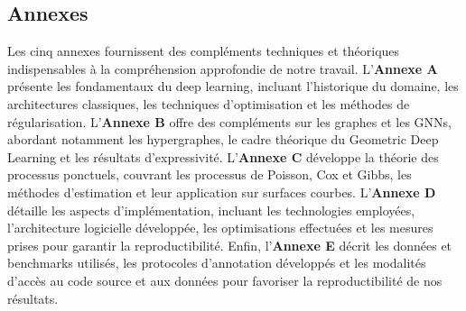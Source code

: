 \subsection{Annexes}

Les cinq annexes fournissent des compléments techniques et théoriques indispensables à la compréhension approfondie de notre travail. L'\textbf{Annexe A} présente les fondamentaux du deep learning, incluant l'historique du domaine, les architectures classiques, les techniques d'optimisation et les méthodes de régularisation. L'\textbf{Annexe B} offre des compléments sur les graphes et les GNNs, abordant notamment les hypergraphes, le cadre théorique du Geometric Deep Learning et les résultats d'expressivité. L'\textbf{Annexe C} développe la théorie des processus ponctuels, couvrant les processus de Poisson, Cox et Gibbs, les méthodes d'estimation et leur application sur surfaces courbes. L'\textbf{Annexe D} détaille les aspects d'implémentation, incluant les technologies employées, l'architecture logicielle développée, les optimisations effectuées et les mesures prises pour garantir la reproductibilité. Enfin, l'\textbf{Annexe E} décrit les données et benchmarks utilisés, les protocoles d'annotation développés et les modalités d'accès au code source et aux données pour favoriser la reproductibilité de nos résultats.

